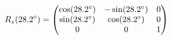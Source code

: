 \documentclass[preview]{standalone}
\begin{document}
\begin{align*}
\special{dvisvgm:raw <g id='unique000'>}R_z(28.2^\circ) = \begin{pmatrix} \cos(28.2^\circ) & -\sin(28.2^\circ) & 0 \\ \sin(28.2^\circ) & \cos(28.2^\circ) & 0 \\ 0 & 0 & 1 \end{pmatrix}\special{dvisvgm:raw </g>}
\end{align*}
\end{document}
